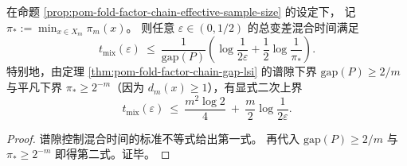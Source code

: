 \begin{corollary}[折叠因子链的总变差混合时间上界]\label{cor:pom-fold-factor-chain-mixing-time-bound}
在命题 \ref{prop:pom-fold-factor-chain-effective-sample-size} 的设定下，
记 \(\pi_\ast:=\min_{x\in X_m}\pi_m(x)\)。
则任意 \(\varepsilon\in(0,1/2)\) 的总变差混合时间满足
\[
t_{\mathrm{mix}}(\varepsilon)\ \le\ \frac{1}{\mathrm{gap}(P)}\left(\log\frac{1}{2\varepsilon}+\frac{1}{2}\log\frac{1}{\pi_\ast}\right).
\]
特别地，由定理 \ref{thm:pom-fold-factor-chain-gap-lsi} 的谱隙下界 \(\mathrm{gap}(P)\ge 2/m\) 与平凡下界 \(\pi_\ast\ge 2^{-m}\)（因为 \(d_m(x)\ge 1\)），有显式二次上界
\[
t_{\mathrm{mix}}(\varepsilon)\ \le\ \frac{m^2\log 2}{4}\ +\ \frac{m}{2}\log\frac{1}{2\varepsilon}.
\]
\end{corollary}
\begin{proof}
谱隙控制混合时间的标准不等式给出第一式。
再代入 \(\mathrm{gap}(P)\ge 2/m\) 与 \(\pi_\ast\ge 2^{-m}\) 即得第二式。证毕。
\end{proof}

\endinput
